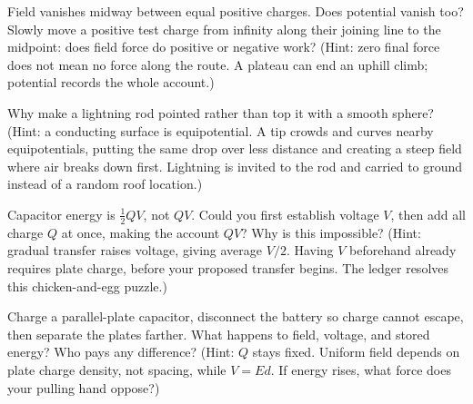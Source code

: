 \begin{puzzles}
\item Field vanishes midway between equal positive charges. Does potential vanish too? Slowly move a positive test charge from infinity along their joining line to the midpoint: does field force do positive or negative work? (Hint: zero final force does not mean no force along the route. A plateau can end an uphill climb; potential records the whole account.)
\item Why make a lightning rod pointed rather than top it with a smooth sphere? (Hint: a conducting surface is equipotential. A tip crowds and curves nearby equipotentials, putting the same drop over less distance and creating a steep field where air breaks down first. Lightning is invited to the rod and carried to ground instead of a random roof location.)
\item Capacitor energy is \(\frac12 QV\), not \(QV\). Could you first establish voltage \(V\), then add all charge \(Q\) at once, making the account \(QV\)? Why is this impossible? (Hint: gradual transfer raises voltage, giving average \(V/2\). Having \(V\) beforehand already requires plate charge, before your proposed transfer begins. The ledger resolves this chicken-and-egg puzzle.)
\item Charge a parallel-plate capacitor, disconnect the battery so charge cannot escape, then separate the plates farther. What happens to field, voltage, and stored energy? Who pays any difference? (Hint: \(Q\) stays fixed. Uniform field depends on plate charge density, not spacing, while \(V=Ed\). If energy rises, what force does your pulling hand oppose?)
\end{puzzles}
